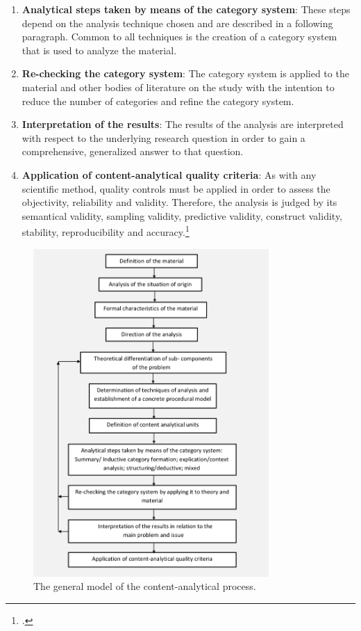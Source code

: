 \begin{enumerate}
    \item \textbf{Analytical steps taken by means of the category system}: These steps depend on the analysis technique chosen and are described in a following paragraph. Common to all techniques is the creation of a category system that is used to analyze the material.
    \item \textbf{Re-checking the category system}: The category system is applied to the material and other bodies of literature on the study with the intention to reduce the number of categories and refine the category system. 
    \item \textbf{Interpretation of the results}: The results of the analysis are interpreted with respect to the underlying research question in order to gain a comprehensive, generalized answer to that question.
    \item \textbf{Application of content-analytical quality criteria}: As with any scientific method, quality controls must be applied in order to assess the objectivity, reliability and validity. Therefore, the analysis is judged by its semantical validity, sampling validity, predictive validity, construct validity, stability, reproducibility and accuracy.\footcites[Cf.][p.40 et seqq]{MayringQualitativeContentAnalysis2014}[cf.][p.280]{Flickintroductionqualitativeresearch2009}
\end{enumerate}

\begin{figure}
    \centering
    \includegraphics[width=0.8\textwidth]{graphics/MayringProcess.png}
    \caption[The general model of the content-analytical process.]{The general model of the content-analytical process.\footnotemark}
    \label{fig:MayringProcess}
\end{figure}

